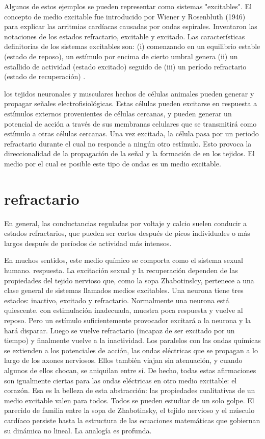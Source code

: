 Algunos de estos ejemplos se pueden representar como sistemas "excitables". El concepto de medio excitable fue introducido por Wiener y Rosenbluth (1946) para explicar las arritmias cardíacas causadas por ondas espirales. Inventaron las notaciones de los estados refractario, excitable y excitado. Las características definitorias de los sistemas excitables son: (i) comenzando en un equilibrio estable (estado de reposo), un estímulo por encima de cierto umbral genera (ii) un estallido de actividad (estado excitado) seguido de (iii) un período refractario (estado de recuperación) .

los tejidos neuronales y musculares hechos de células animales pueden generar y propagar señales electrofisiológicas. Estas células pueden excitarse en respuesta a estímulos externos provenientes de células cercanas, y pueden generar un potencial de acción a través de sus membranas celulares que se transmitirá como estímulo a otras células cercanas. Una vez excitada, la célula pasa por un periodo refractario durante el cual no responde a ningún otro estímulo. Esto provoca la direccionalidad de la propagación de la señal y la formación de  en los tejidos. El medio por el cual es posible este tipo de ondas es un medio excitable. 

\section{refractario}


En general, las conductancias reguladas por voltaje y calcio suelen conducir a estados refractarios, que pueden ser cortos después de picos individuales o más largos después de períodos de actividad más intensos.

En muchos sentidos, este medio químico se comporta como el sistema sexual humano. respuesta. La excitación sexual y la recuperación dependen de las propiedades del tejido nervioso que, como la sopa Zhabotinslcy, pertenece a una clase general de sistemas llamados medios excitables. Una neurona tiene tres estados: inactivo, excitado y refractario. Normalmente una neurona está quiescente. con estimulación inadecuada, muestra poca respuesta y vuelve al reposo. Pero un estímulo suficientemente provocador excitará a la neurona y la hará disparar. Luego se vuelve refractario (incapaz de ser excitado por un tiempo) y finalmente vuelve a la inactividad. Los paralelos con las ondas químicas se extienden a los potenciales de acción, las ondas eléctricas que se propagan a lo largo de los axones nerviosos. Ellos también viajan sin atenuación, y cuando algunos de ellos chocan, se aniquilan entre sí. De hecho, todas estas afirmaciones son igualmente ciertas para las ondas eléctricas en otro medio excitable: el corazón. Esa es la belleza de esta abstracción: las propiedades cualitativas de un medio excitable valen para todos. Todos se pueden estudiar de un solo golpe. El parecido de familia entre la sopa de Zhabotinsky, el tejido nervioso y el músculo cardíaco persiste hasta la estructura de las ecuaciones matemáticas que gobiernan su dinámica no lineal. La analogía es profunda.




